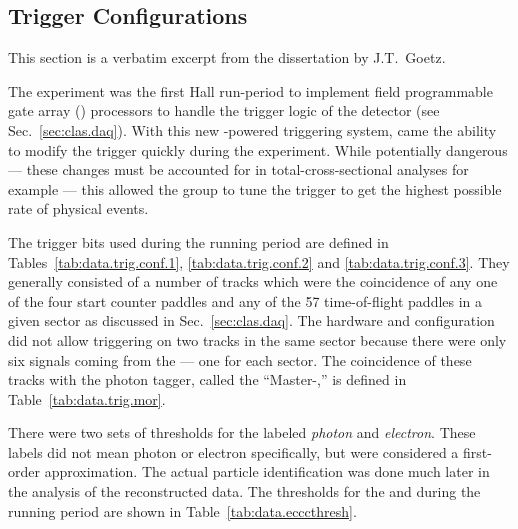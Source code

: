 \subsection{\label{sec:summary.trigger}Trigger Configurations}

\begin{center} \color{OliveGreen}
This section is a verbatim excerpt from the dissertation by J.T.\ Goetz\cite{clas.thesis.goetz}.
\end{center}

The  experiment was the first Hall  run-period to implement field programmable gate array () processors to handle the trigger logic of the  detector (see Sec.~\ref{sec:clas.daq}). With this new -powered triggering system, came the ability to modify the trigger quickly during the experiment. While potentially dangerous --- these changes must be accounted for in total-cross-sectional analyses for example --- this allowed the group to tune the trigger to get the highest possible rate of physical events.

The trigger bits used during the  running period are defined in Tables~\ref{tab:data.trig.conf.1}, \ref{tab:data.trig.conf.2} and \ref{tab:data.trig.conf.3}. They generally consisted of a number of tracks which were the coincidence of any one of the four start counter paddles and any of the 57 time-of-flight paddles in a given sector as discussed in Sec.~\ref{sec:clas.daq}. The hardware and configuration did not allow triggering on two tracks in the same sector because there were only six signals coming from the  --- one for each sector. The coincidence of these tracks with the photon tagger, called the ``Master-,'' is defined in Table~\ref{tab:data.trig.mor}.





There were two sets of thresholds for the  labeled \emph{photon} and \emph{electron}. These labels did not mean photon or electron specifically, but were considered a first-order approximation. The actual particle identification was done much later in the analysis of the reconstructed data. The thresholds for the  and  during the  running period are shown in Table~\ref{tab:data.ecccthresh}.


\FloatBarrier
